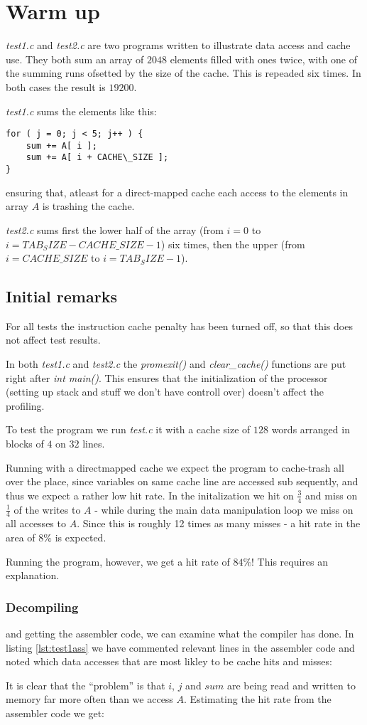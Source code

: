 \section{Warm up}
\emph{test1.c} and \emph{test2.c} are two programs written to illustrate data
access and cache use. They both sum an array of $2048$ elements filled with ones
twice, with one of the summing runs ofsetted by the size of the cache. This is repeaded six
times. In both cases the result is $19200$.

\emph{test1.c} sums the elements like this:
\begin{lstlisting}
for ( j = 0; j < 5; j++ ) {
	sum += A[ i ];
	sum += A[ i + CACHE\_SIZE ];
}
\end{lstlisting}
ensuring that, atleast for a direct-mapped cache each access to the elements in
array $A$ is trashing the cache.

\emph{test2.c} sums first the lower half of the array (from $i=0$ to
$i=TAB_SIZE-CACHE\_SIZE-1$) six times, then the upper (from $i=CACHE\_SIZE$ to
$i=TAB_SIZE-1$).

\subsection{Initial remarks}
For all tests the instruction cache penalty has been turned off, so that this
does not affect test results.

In both \emph{test1.c} and \emph{test2.c} the \emph{promexit()} and
\emph{clear\_cache()} functions are put right after \emph{int main()}. This
ensures that the initialization of the processor (setting up stack and stuff we
don't have controll over) doesn't affect the profiling.

To test the program we run \emph{test.c} it with a cache size of $128$ words
arranged in blocks of $4$ on $32$ lines.

Running with a directmapped cache we expect the program to cache-trash all over
the place, since variables on same cache line are accessed sub sequently, and
thus we expect a rather low hit rate.
In the initalization we hit on $\frac{3}{4}$ and miss on $\frac{1}{4}$ of the writes to $A$ - while during
the main data manipulation loop we miss on all accesses to $A$. Since this is
roughly 12 times as many misses - a hit rate in the area of $8\%$ is expected. 

Running the program, however, we get a hit rate of $84\%$! This requires an
explanation.
\subsubsection{Decompiling} and getting the assembler code, we can examine what
the compiler has done. In listing \ref{lst:test1ass} we have commented relevant
lines in the assembler code and noted which data accesses that are most likley
to be cache hits and misses:

It is clear that the ``problem'' is that $i$, $j$ and $sum$ are being read and
written to memory far more often than we access $A$.
Estimating the hit rate from the assembler code we get:


